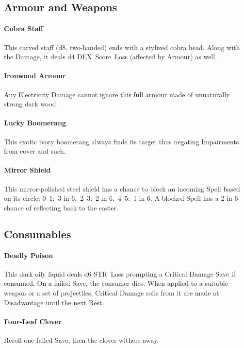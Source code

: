 \documentclass[itdr/core]{subfiles}
\begin{document}
\vfill
\break

\subsection*{Armour and Weapons}

\paragraph{Cobra Staff}
This carved staff (d8, two-handed) ends with a stylized cobra head. Along with the Damage, it deals d4 DEX~Score~Loss (affected by Armour) as well.

\paragraph{Ironwood Armour}
Any Electricity Damage cannot ignore this full \mbox{armour} made of unnaturally strong dark wood.

\paragraph{Lucky Boomerang}
This exotic ivory boomerang always finds its target thus negating Impairments from cover and such.

\paragraph{Mirror Shield}
This mirror-polished steel shield has a chance to block an incoming Spell based on its circle: \mbox{0--1: 3-in-6, 2--3: 2-in-6, 4--5: 1-in-6}. A blocked Spell has a 2-in-6 chance of reflecting back to the caster.

\vfill

\subsection*{Consumables}

\paragraph{Deadly Poison}
This dark oily liquid deals d6 STR~Loss prompting a Critical Damage Save if consumed. On a failed Save, the consumer dies. When applied to a suitable weapon or a set of projectiles, Critical Damage rolls from it are made at Disadvantage until the next Rest.

\paragraph{Four-Leaf Clover}
Reroll one failed Save, then the clover withers away.
\end{document}
